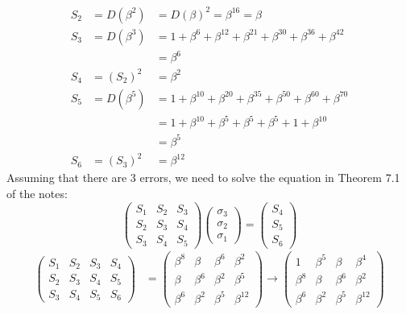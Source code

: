 \documentclass[11pt]{article}
\newcommand{\vc}[1]{\begin{pmatrix}#1\end{pmatrix}}
\newcommand{\taugm}[1]{{\left(\begin{array}{lll|l}#1\end{array}\right)}}
\begin{document}
\begin{itemize}
\[\begin{array}{lll}
                      S_2 &= D(\beta^2)&= D(\beta)^2 = \beta^{16} = \beta\\
                      S_3 &= D(\beta^3)&= 1 + \beta^6 +  \beta^{12} +  \beta^{21}    +  \beta^{30} +  \beta^{36} +  \beta^{42} \\
                          &            &= \beta^6 \\
                      S_4 &= (S_2)^2   &= \beta^2\\
                      S_5 &= D(\beta^5)&= 1 + \beta^{10} + \beta^{20} + \beta^{35} + \beta^{50} + \beta^{60} + \beta^{70} \\
                          &            &= 1 + \beta^{10} + \beta^5    + \beta^5    + \beta^5    + 1          + \beta^{10} \\
                          &            &= \beta^5\\
                      S_6 &= (S_3)^2   &= \beta^{12}
                    \end{array}
                  \]
                  Assuming that there are 3 errors,
                  we need to solve the equation in Theorem 7.1 of the notes:
                  \[
                      \vc{S_1 & S_2 & S_3\\
                          S_2 & S_3 & S_4\\
                          S_3 & S_4 & S_5}
                      \vc{\sigma_3\\\sigma_2\\\sigma_1}
                    = \vc{S_4\\S_5\\S_6}
                  \]
                  \begin{align*}
                    \taugm{S_1 & S_2 & S_3 & S_4\\
                           S_2 & S_3 & S_4 & S_5\\
                           S_3 & S_4 & S_5 & S_6}
                   &=
                    \taugm{\beta^8 & \beta   & \beta^6 & \beta^2\\
                           \beta   & \beta^6 & \beta^2 & \beta^5\\
                           \beta^6 & \beta^2 & \beta^5 & \beta^{12}}
                    \to
                    \taugm{    1   & \beta^5 & \beta   & \beta^4\\
                           \beta^8 & \beta   & \beta^6 & \beta^2\\
                           \beta^6 & \beta^2 & \beta^5 & \beta^{12}}\\

\end{align*}
\end{itemize}
\end{document}
